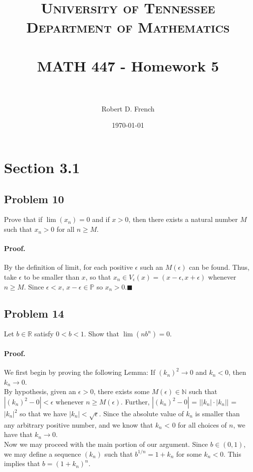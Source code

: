 \documentclass[paper=a4, fontsize=11pt]{scrartcl} %
\title{	
\normalfont \normalsize 
\textsc{University of Tennessee \\ Department of Mathematics} \\ [25pt] %
\horrule{0.5pt} \\[0.4cm] %
\huge MATH 447 - Homework 5 \\ %
\horrule{2pt} \\[0.5cm] %
}
\author{Robert D. French} %
\date{\normalsize\today} %
\numberwithin{equation}{section} %
\numberwithin{figure}{section} %
\numberwithin{table}{section} %
\begin{document}
\maketitle %


\section*{Section 3.1}

\newcommand{\prob}[1]{\subsection*{Problem {#1}}}
\newcommand{\subprob}[1]{\subsubsection*{{#1}}}
\newcommand{\pf}{\paragraph{Proof.}}
\newcommand{\done}{$\blacksquare$}

\prob{10} Prove that if $\lim(x_n) = 0$ and if $x > 0$, then there exists a natural number $M$ such that $x_n > 0$ for all $n \geq M$.

\pf By the definition of limit, for each positive $\epsilon$ such an $M(\epsilon)$ can be found. Thus, take $\epsilon$ to be smaller than $x$, so that $x_n \in V_\epsilon (x) = (x - \epsilon, x + \epsilon)$ whenever $n \geq M$. Since $\epsilon < x$, $x - \epsilon \in \mathbb{P}$ so $x_n > 0$.\done

\prob{14} Let $b \in \mathbb{R}$ satisfy $0 < b < 1$. Show that $\lim(nb^n) = 0$.

\pf We first begin by proving the following Lemma: If $(k_n)^2 \rightarrow 0$ and $k_n < 0$, then $k_n \rightarrow 0$.\\

By hypothesis, given an $\epsilon > 0$, there exists some $M(\epsilon) \in \mathbb{N}$ such that  $|(k_n)^2 - 0| < \epsilon$ whenever $n \geq M(\epsilon)$. Further, $|(k_n)^2 - 0|$ = $\left| \left| k_n \right| \cdot \left| k_n \right| \right|$ = $|k_n|^2$ so that we have $|k_n| < \sqrt{\epsilon}$. Since the absolute value of $k_n$ is smaller than any arbitrary positive number, and we know that $k_n$ < 0 for all choices of $n$, we have that $k_n \rightarrow 0$.\\

Now we may proceed with the main portion of our argument. Since $b \in (0,1)$, we may define a sequence $(k_n)$ such that $b^{1/n} = 1 + k_n$ for some $k_n < 0$. This implies that $b = (1 + k_n)^n$.\\
\end{document}
